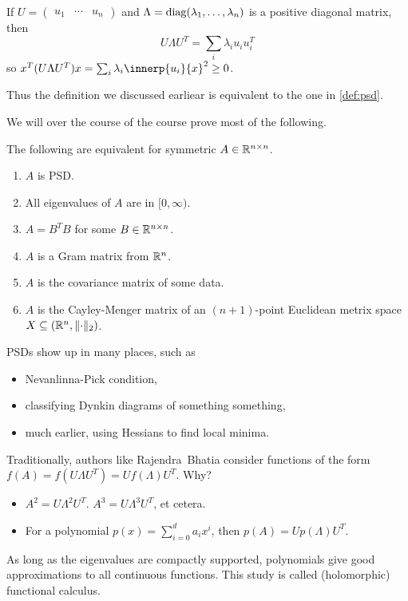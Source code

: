\begin{remark}
    If $U = \begin{pmatrix}
        u_1 & \cdots & u_n
    \end{pmatrix}$ and $\Lambda = \operatorname{diag}(\lambda_1, \dots, \lambda_n)$
    is a positive diagonal matrix, then \[
        U \Lambda U^T = \sum_i \lambda_i u_i u_i^T
    \] so $x^T (U \Lambda U^T) x = \sum_i \lambda_i \innerp{u_i}{x}^2 \ge 0$.

    Thus the definition we discussed earliear is equivalent to the one in
    \cref{def:psd}.
\end{remark}

We will over the course of the course prove most of the following.
\begin{theorem} \label{thm:psd-equiv}
    The following are equivalent for symmetric $A \in \mathbb{R}^{n \times n}$.
    \begin{enumerate}
        \item $A$ is PSD. \label{thm:psd-equiv:1}
        \item All eigenvalues of $A$ are in $[0, \infty)$. \label{thm:psd-equiv:2}
        \item $A = B^T B$ for some $B \in \mathbb{R}^{n \times n}$. \label{thm:psd-equiv:3}
        \item $A$ is a Gram matrix from $\mathbb{R}^n$. \label{thm:psd-equiv:4}
        \item $A$ is the covariance matrix of some data. \label{thm:psd-equiv:5}
        \item $A$ is the Cayley-Menger matrix of an $(n + 1)$-point
            Euclidean metrix space $X \subseteq (\mathbb{R}^n, \lVert\cdot\rVert_2)$. \label{thm:psd-equiv:6}
    \end{enumerate}
\end{theorem}
PSDs show up in many places, such as
\begin{itemize}
    \item Nevanlinna-Pick condition,
    \item classifying Dynkin diagrams of something something,
    \item much earlier, using Hessians to find local minima.
\end{itemize}

Traditionally, authors like Rajendra~Bhatia consider functions of the form
$f(A) = f(U \Lambda U^T) = U f(\Lambda) U^T$.
Why?
\begin{itemize}
    \item $A^2 = U \Lambda^2 U^T$.
        $A^3 = U \Lambda^3 U^T$, et cetera.
    \item For a polynomial $p(x) = \sum_{i=0}^d a_i x^i$, then
        $p(A) = U p(\Lambda) U^T$.
\end{itemize}
As long as the eigenvalues are compactly supported, polynomials give good
approximations to all continuous functions.
This study is called (holomorphic) functional calculus.

